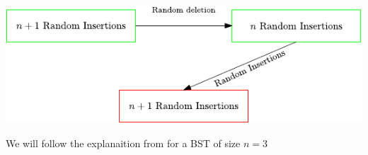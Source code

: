 \documentclass{beamer}
\begin{document}
\begin{frame}
    \begin{center}
        \includegraphics[]{bst.pdf}
    \end{center}
\end{frame}

\begin{frame}
    We will follow the explanaition from \cite{jonassen1978trivial} for a BST of size $n = 3$
\end{frame}
\end{document}
